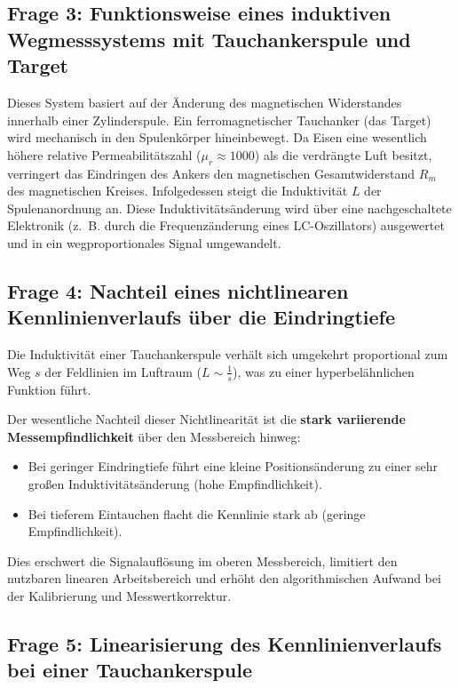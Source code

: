 \documentclass[12pt,a4paper]{article}
\begin{document}
\subsection*{Frage 3: Funktionsweise eines induktiven Wegmesssystems mit Tauchankerspule und Target}

Dieses System basiert auf der Änderung des magnetischen Widerstandes innerhalb einer Zylinderspule. Ein ferromagnetischer Tauchanker (das Target) wird mechanisch in den Spulenkörper hineinbewegt. Da Eisen eine wesentlich höhere relative Permeabilitätszahl ($\mu_r \approx 1000$) als die verdrängte Luft besitzt, verringert das Eindringen des Ankers den magnetischen Gesamtwiderstand $R_m$ des magnetischen Kreises. Infolgedessen steigt die Induktivität $L$ der Spulenanordnung an. Diese Induktivitätsänderung wird über eine nachgeschaltete Elektronik (z.~B. durch die Frequenzänderung eines LC-Oszillators) ausgewertet und in ein wegproportionales Signal umgewandelt.

\subsection*{Frage 4: Nachteil eines nichtlinearen Kennlinienverlaufs über die Eindringtiefe}

Die Induktivität einer Tauchankerspule verhält sich umgekehrt proportional zum Weg $s$ der Feldlinien im Luftraum ($L \sim \frac{1}{s}$), was zu einer hyperbelähnlichen Funktion führt. 

Der wesentliche Nachteil dieser Nichtlinearität ist die \textbf{stark variierende Messempfindlichkeit} über den Messbereich hinweg:
\begin{itemize}
    \item Bei geringer Eindringtiefe führt eine kleine Positionsänderung zu einer sehr großen Induktivitätsänderung (hohe Empfindlichkeit).
    \item Bei tieferem Eintauchen flacht die Kennlinie stark ab (geringe Empfindlichkeit).
\end{itemize}
Dies erschwert die Signalauflösung im oberen Messbereich, limitiert den nutzbaren linearen Arbeitsbereich und erhöht den algorithmischen Aufwand bei der Kalibrierung und Messwertkorrektur.

\subsection*{Frage 5: Linearisierung des Kennlinienverlaufs bei einer Tauchankerspule}
\end{document}
